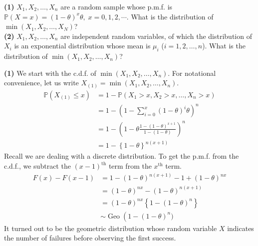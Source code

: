 \documentclass[answers]{exam}
\newcommand{\opn}{\operatorname}
\begin{document}
\newpage
{}
\begin{questions}
   \question
   \textbf{(1)} $X_{1}, X_{2}, \ldots , X_{n}$ are a random sample whose p.m.f. is $\mathbb{P}\left(X = x\right) = \left(1-\theta\right)^{x}\theta, \; x = 0, 1, 2, \cdots$. What is the distribution of $\min \left(X_{1}, X_{2}, \ldots , X_{N}\right)$?\\
   \textbf{(2)} $X_{1}, X_{2}, \ldots , X_{n}$ are independent random variables, of which the distribution of $X_{i}$ is an exponential distribution whose mean is $\mu_{i}$ ($i = 1, 2, \ldots , n$). What is the distribution of $\min \left(X_{1}, X_{2}, \ldots , X_{n}\right)$?
\begin{solution}
   \textbf{(1)} We start with the c.d.f. of $\min \left(X_{1}, X_{2}, \ldots , X_{n}\right)$. For notational convenience, let us write $X_{\left(1\right)} = \min \left(X_{1}, X_{2}, \ldots , X_{n}\right)$.
   \begin{align*}
      \mathbb{P}\left(X_{\left(1\right)} \leq x\right) &= 1 - \mathbb{P}\left(X_{1}>x, X_{2}>x, \ldots, X_{n}>x\right)\\
      &= 1-\left(1-\sum_{i=0}^{x}\left(1-\theta\right)^{i}\theta \right)^{n}\\
      &= 1 - \left(1-\theta \frac{1-\left(1-\theta\right)^{x+1}}{1-\left(1-\theta\right)}\right)^{n}\\
      &= 1- \left\{1-\theta \right\}^{n\left(x+1\right)}
   \end{align*}
   Recall we are dealing with a discrete distribution. To get the p.m.f. from the c.d.f., we subtract the $\left(x-1\right)^{\text{th}}$ term from the $x^{\text{th}}$ term.
   \begin{align*}
      F\left(x\right) - F\left(x-1\right) &= 1- \left(1-\theta\right)^{n\left(x+1\right)} - 1 + \left(1-\theta\right)^{nx}\\
      &= \left(1-\theta\right)^{nx} - \left(1-\theta\right)^{n\left(x+1\right)}\\
      &= \left(1-\theta\right)^{nx}\left\{1 - \left(1-\theta\right)^{n} \right\}\\
      &\sim \opn{Geo}\left(1-\left(1-\theta\right)^{n})
   \end{align*}
   It turned out to be the geometric distribution whose random variable $X$ indicates the number of failures before observing the first success.
\end{solution}

\end{questions}
\end{document}
